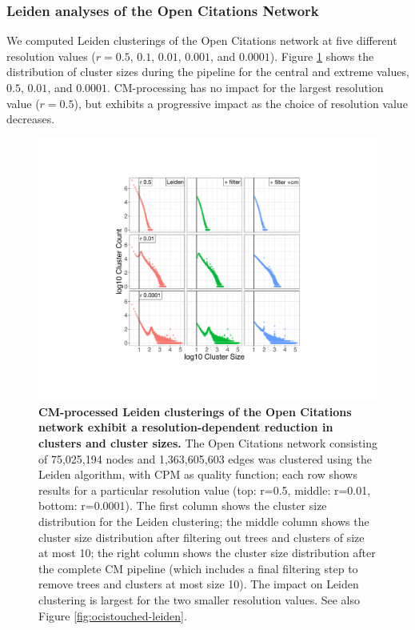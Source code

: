 \documentclass[11pt]{article}   	%
\begin{document}
\subsubsection{Leiden analyses of the Open Citations Network}
We computed Leiden clusterings of the Open Citations network at five different resolution values ($r=0.5$, $0.1$, $0.01$, $0.001$, and $0.0001$). Figure \ref{fig:oc_size_count_plots_leiden} shows the distribution of cluster sizes during the pipeline for the central and extreme values, $0.5$, $0.01$, and $0.0001$.
CM-processing  has no impact for the largest resolution value ($r=0.5$), but exhibits a progressive impact as the choice of resolution value decreases.

\begin{figure}[H]
\centering
\includegraphics[width=\linewidth]{figs/fig1_kn.pdf}
\caption{\textbf{CM-processed Leiden clusterings of the Open Citations network exhibit a resolution-dependent reduction in clusters and cluster sizes.}
The Open Citations network consisting of 75,025,194 nodes and 1,363,605,603 edges was clustered using the Leiden algorithm,
with CPM as quality function; each row shows results for a particular resolution value (top: r=0.5, middle: r=0.01, bottom: r=0.0001).
The first column shows the cluster size distribution for the Leiden clustering; the middle column shows the cluster size distribution after filtering out trees and clusters of size at most 10; the right column shows the cluster size distribution after the complete CM pipeline (which includes a final filtering step to remove trees and clusters at most size 10).
The impact on Leiden clustering is largest for the two smaller resolution values.
See also    Figure \ref{fig:ocistouched-leiden}.}
\label{fig:oc_size_count_plots_leiden}
\end{figure}
\end{document}
